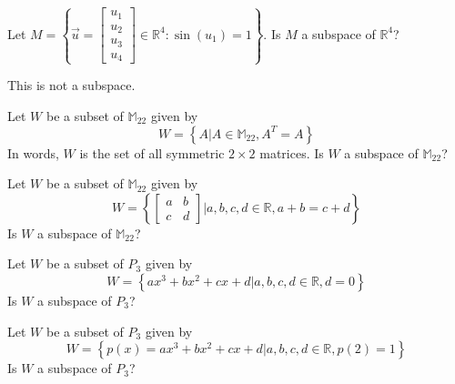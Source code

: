 \documentclass{ximera}
\begin{document}
\begin{problem}\label{prb:10.63} Let $M=\left\{ \vec{u}=\begin{bmatrix} u_{1}\\u_{2}\\u_{3}\\u_{4}\end{bmatrix} \in
\mathbb{R}^{4}:\sin \left( u_{1}\right) =1\right\} .$ Is $M$ a subspace of $\mathbb{R}^4$?
\begin{hint}
This is not a subspace.
\end{hint}
\end{problem}

\begin{problem}\label{prb:10.64} Let $W$ be a subset of $\mathbb{M}_{22}$ given by
\[
W = \left\{ A | A \in \mathbb{M}_{22}, A^T = A \right\}
\]
In words, $W$ is the set of all symmetric $2 \times 2$ matrices. Is $W$ a subspace of $\mathbb{M}_{22}$?
\end{problem}

\begin{problem}\label{prb:10.65} Let $W$ be a subset of $\mathbb{M}_{22}$ given by
\[
W = \left\{ \left[ \begin{array}{rr}
a  & b \\
c & d
\end{array} \right] | a,b,c,d \in \mathbb{R}, a + b = c + d \right\}
\]
Is $W$ a subspace of $\mathbb{M}_{22}$?
\end{problem}

\begin{problem}\label{prb:10.66} Let $W$ be a subset of $P_3$ given by
\[
W = \left\{
ax^3 + bx^2 + cx + d | a,b,c,d \in \mathbb{R}, d = 0 \right\}
\]
Is $W$ a subspace of $P_3$?
\end{problem}

\begin{problem}\label{prb:10.67} Let $W$ be a subset of $P_3$ given by
\[
W = \left\{
p(x) = ax^3 + bx^2 + cx + d | a,b,c,d \in \mathbb{R}, p(2) = 1 \right\}
\]
Is $W$ a subspace of $P_3$?
\end{problem}
\end{document}
